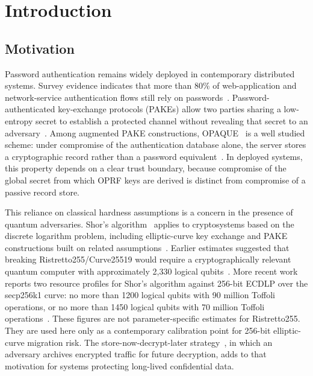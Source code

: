 \documentclass[preprint,12pt]{elsarticle}
\newcommand{\codeid}[1]{\textsf{#1}}
\theoremstyle{remark}
\begin{document}
\section{Introduction}

\subsection{Motivation}

Password authentication remains widely deployed in contemporary distributed systems. Survey evidence indicates that more than 80\% of web-application and network-service authentication flows still rely on passwords~\cite{bonneau2012,florencio2007}. Password-authenticated key-exchange protocols (PAKEs) allow two parties sharing a low-entropy secret to establish a protected channel without revealing that secret to an adversary~\cite{bellare2000}. Among augmented PAKE constructions, OPAQUE~\cite{jarecki2018} is a well studied scheme: under compromise of the authentication database alone, the server stores a cryptographic record rather than a password equivalent~\cite{ietf-opaque}. In deployed systems, this property depends on a clear trust boundary, because compromise of the global secret from which OPRF keys are derived is distinct from compromise of a passive record store.

This reliance on classical hardness assumptions is a concern in the presence of quantum adversaries. Shor's algorithm~\cite{shor1994} applies to cryptosystems based on the discrete logarithm problem, including elliptic-curve key exchange and PAKE constructions built on related assumptions~\cite{bernstein2017}. Earlier estimates suggested that breaking Ristretto255/Curve25519 would require a cryptographically relevant quantum computer with approximately 2{,}330 logical qubits~\cite{roetteler2017}. More recent work reports two resource profiles for Shor's algorithm against 256-bit ECDLP over the \codeid{secp256k1} curve: no more than 1200 logical qubits with 90 million Toffoli operations, or no more than 1450 logical qubits with 70 million Toffoli operations~\cite{babbush2026}. These figures are not parameter-specific estimates for Ristretto255. They are used here only as a contemporary calibration point for 256-bit elliptic-curve migration risk. The store-now-decrypt-later strategy~\cite{mosca2018}, in which an adversary archives encrypted traffic for future decryption, adds to that motivation for systems protecting long-lived confidential data.
\end{document}
